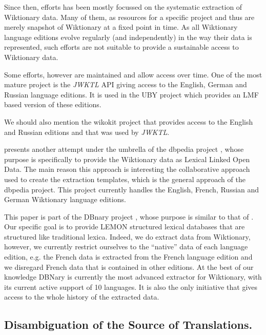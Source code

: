\documentclass[10pt, a4paper]{article}
\begin{document}
Since then, efforts has been mostly focussed on the systematic extraction of Wiktionary data. Many of them, as resources for a specific project and thus are merely snapshot of Wiktionary at a fixed point in time. As all Wiktionary language editions evolve regularly (and independently) in the way their data is represented, such efforts are not suitable to provide a sustainable access to Wiktionary data. 

Some efforts, however are maintained and allow access over time. One of the most mature project is the \emph{JWKTL} API \cite{ZeschMuellerGurevych2008} giving access to  the English, German and Russian language editions. It is used in the UBY project \cite{gurevych2012uby} which provides an LMF based version of these editions. 

We should also mention the wikokit project \cite{krizhanovsky2010transformation} that provides access to the English and Russian editions and that was used by \emph{JWKTL}.

\cite{HellmannSebastianandBrekleJonasandAuer} presents another attempt under the umbrella of the dbpedia project \cite{dbpedia-swj}, whose purpose is specifically to provide the Wiktionary data as Lexical Linked Open Data. The main reason this approach is interesting the collaborative approach used to create the extraction templates, which is the general approach of the dbpedia project. This project currently handles the English, French, Russian and German Wiktionary language editions.

This paper is part of the DBnary project \cite{serasset:dbnary-swj}, whose purpose is similar to that of \cite{HellmannSebastianandBrekleJonasandAuer}. Our specific goal is to provide LEMON structured lexical databases that are structured like traditional lexica. Indeed, we do extract data from Wiktionary, however, we currently restrict ourselves to the ``native'' data of each language edition, e.g. the French data is extracted from the French language edition and we disregard French data that is contained in other editions. At the best of our knowledge DBNary is currently the most advanced extractor for Wiktionary, with its current active support of 10 languages. It is also the only initiative that gives access to the whole history of the extracted data.

\subsection{Disambiguation of the Source of Translations.} 
\end{document}
